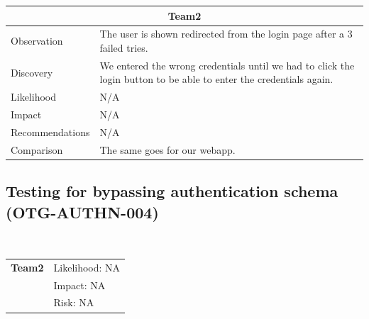 \documentclass[headsepline,footsepline,footinclude=false,oneside,fontsize=11pt,paper=a4,listof=totoc,bibliography=totoc]{scrbook} %
\begin{document}
\begin{tabular}{ l|p{11cm}  }
	\hline
	\multicolumn{2}{c}{\textbf{Team2}} \\
	\hline
	Observation   & The user is shown redirected from the login page after a 3 failed tries. \\
	Discovery  &We entered the wrong credentials until we had to click the login button to be able to enter the credentials again.\\
	Likelihood & N/A \\
	Impact    &  N/A \\
	Recommendations &  N/A\\
	Comparison & The same goes for our webapp.\\
	\hline
\end{tabular}

\pagebreak
\subsection{Testing for bypassing authentication schema (OTG-AUTHN-004)}\

\begin{tabular}{cR{12cm}}
	\textbf{Team2} & Likelihood: NA\\& Impact: NA\\& Risk: NA
\end{tabular}
\end{document}

